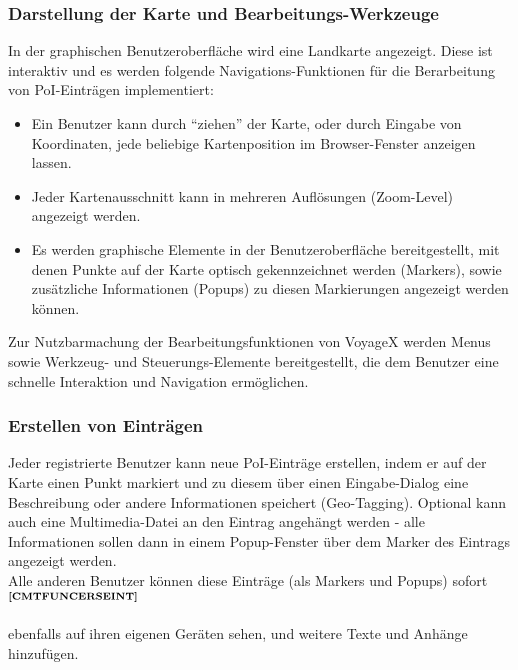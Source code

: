 \subsubsection{Darstellung der Karte und Bearbeitungs-Werkzeuge}
In der graphischen Benutzeroberfläche wird eine Landkarte angezeigt. Diese ist interaktiv und es werden
folgende Navigations-Funktionen für die Berarbeitung von PoI-Einträgen implementiert:
\begin{itemize}
  \item Ein Benutzer kann durch "`ziehen"' der Karte, oder durch Eingabe von Koordinaten, jede beliebige Kartenposition im Browser-Fenster anzeigen lassen.
  \item Jeder Kartenausschnitt kann in mehreren Auflösungen (Zoom-Level) angezeigt werden.
  \item Es werden graphische Elemente in der Benutzeroberfläche bereitgestellt, mit denen Punkte auf der Karte optisch gekennzeichnet werden (Markers), sowie zusätzliche Informationen (Popups) zu diesen Markierungen angezeigt werden können.
\end{itemize}
Zur Nutzbarmachung der Bearbeitungsfunktionen von VoyageX werden Menus sowie Werkzeug- und Steuerungs-Elemente bereitgestellt, die dem Benutzer eine schnelle Interaktion und Navigation ermöglichen.

\subsubsection{Erstellen von Einträgen}
Jeder registrierte Benutzer kann neue PoI-Einträge erstellen, indem er auf der Karte einen Punkt markiert und zu diesem über einen Eingabe-Dialog eine Beschreibung oder andere Informationen speichert (Geo-Tagging). Optional kann auch eine Multimedia-Datei an den Eintrag angehängt werden - alle Informationen sollen dann in einem Popup-Fenster über dem Marker des Eintrags angezeigt werden.\\
Alle anderen Benutzer können diese Einträge (als Markers und Popups) sofort$^{\textbf{\ref{CMTFUNCERSEINT}}}$%
\addtocounter{footnote}{1}%
 ebenfalls auf ihren eigenen Geräten sehen, und weitere Texte und Anhänge hinzufügen.


